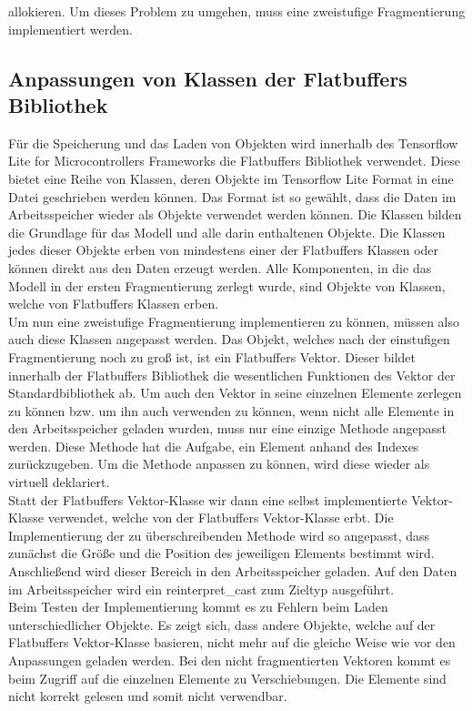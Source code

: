 allokieren. Um dieses Problem zu umgehen, muss eine zweistufige Fragmentierung implementiert werden.

\subsection{Anpassungen von Klassen der Flatbuffers Bibliothek}
    Für die Speicherung und das Laden von Objekten wird innerhalb des Tensorflow Lite for Microcontrollers Frameworks die Flatbuffers Bibliothek verwendet. Diese bietet eine Reihe von Klassen, deren Objekte im Tensorflow Lite Format in eine Datei geschrieben werden können. Das Format ist so gewählt, dass die Daten im Arbeitsspeicher wieder als Objekte verwendet werden können. Die Klassen bilden die Grundlage für das Modell und alle darin enthaltenen Objekte. Die Klassen jedes dieser Objekte erben von mindestens einer der Flatbuffers Klassen oder können direkt aus den Daten erzeugt werden. Alle Komponenten, in die das Modell in der ersten Fragmentierung zerlegt wurde, sind Objekte von Klassen, welche von Flatbuffers Klassen erben.\\ Um  nun eine zweistufige Fragmentierung implementieren zu können, müssen also auch diese Klassen angepasst werden. Das Objekt, welches nach der einstufigen Fragmentierung noch zu groß ist, ist ein Flatbuffers Vektor. Dieser bildet innerhalb der Flatbuffers Bibliothek die wesentlichen Funktionen des Vektor der Standardbibliothek ab. Um auch den Vektor in seine einzelnen Elemente zerlegen zu können bzw. um ihn auch verwenden zu können, wenn nicht alle Elemente in den Arbeitsspeicher geladen wurden, muss nur eine einzige Methode angepasst werden. Diese Methode hat die Aufgabe, ein Element anhand des Indexes zurückzugeben. Um die Methode anpassen zu können, wird diese wieder als virtuell deklariert.\\ Statt der Flatbuffers Vektor-Klasse wir dann eine selbst implementierte Vektor-Klasse verwendet, welche von der Flatbuffers Vektor-Klasse erbt. Die Implementierung der zu überschreibenden Methode wird so angepasst, dass zunächst die Größe und die Position des jeweiligen Elements bestimmt wird. Anschließend wird dieser Bereich in den Arbeitsspeicher geladen. Auf den Daten im Arbeitsspeicher wird ein reinterpret\_cast zum Zieltyp ausgeführt.\\ Beim Testen der Implementierung kommt es zu Fehlern beim Laden unterschiedlicher Objekte. Es zeigt sich, dass andere Objekte, welche auf der Flatbuffers Vektor-Klasse basieren, nicht mehr auf die gleiche Weise wie vor den Anpassungen geladen werden. Bei den nicht fragmentierten Vektoren kommt es beim Zugriff auf die einzelnen Elemente zu Verschiebungen. Die Elemente sind nicht korrekt gelesen und somit nicht verwendbar. 

